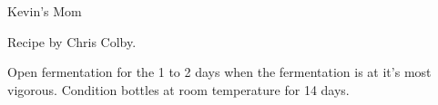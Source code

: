 \begin{recipe}{Kevin's Mom}

\begin{aboutblock}
Recipe by Chris Colby. 
\end{aboutblock}


\begin{methodandtiming}
 
\begin{mashsteps}
\end{mashsteps}

\begin{fermentationsteps}
\end{fermentationsteps}

\begin{directions}
Open fermentation for the 1 to 2 days when the fermentation is at
it's most vigorous. Condition bottles at room temperature for 14 days.
\end{directions}

\end{methodandtiming}

\recipebreak

\begin{ingredientsblock}

\begin{malts}
\end{malts}

\begin{hops}
\end{hops}

\begin{yeastsx}
\end{yeastsx}

\begin{twists}
\end{twists}

\end{ingredientsblock}

\end{recipe}

